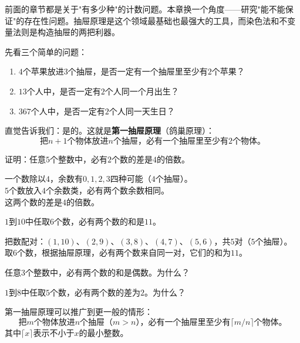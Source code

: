 
前面的章节都是关于"有多少种"的计数问题。本章换一个角度——研究"能不能保证"的存在性问题。抽屉原理是这个领域最基础也最强大的工具，而染色法和不变量法则是构造抽屉的两把利器。


先看三个简单的问题：
\begin{enumerate}
\item $4$个苹果放进$3$个抽屉，是否一定有一个抽屉里至少有$2$个苹果？
\item $13$个人中，是否一定有$2$个人同一个月出生？
\item $367$个人中，是否一定有$2$个人同一天生日？
\end{enumerate}

直觉告诉我们：是的。这就是\textbf{第一抽屉原理}（鸽巢原理）：
\[
\text{把$n+1$个物体放进$n$个抽屉，必有一个抽屉里至少有$2$个物体。}
\]

\begin{example}
证明：任意$5$个整数中，必有$2$个数的差是$4$的倍数。
\end{example}
\begin{solution}
一个数除以$4$，余数有$0,1,2,3$四种可能（$4$个抽屉）。\\
$5$个数放入$4$个余数类，必有两个数余数相同。\\
这两个数的差是$4$的倍数。
\end{solution}

\begin{example}
$1$到$10$中任取$6$个数，必有两个数的和是$11$。
\end{example}
\begin{solution}
把数配对：$(1,10)$、$(2,9)$、$(3,8)$、$(4,7)$、$(5,6)$，共$5$对（$5$个抽屉）。\\
取$6$个数，根据抽屉原理，必有两个数来自同一对，它们的和为$11$。
\end{solution}

\begin{exercise}
\item 任意$3$个整数中，必有两个数的和是偶数。为什么？
\item $1$到$8$中任取$5$个数，必有两个数的差为$2$。为什么？
\end{exercise}


第一抽屉原理可以推广到更一般的情形：
\[
\text{把$m$个物体放进$n$个抽屉（$m>n$），必有一个抽屉里至少有$\lceil m/n\rceil$个物体。}
\]
其中$\lceil x\rceil$表示不小于$x$的最小整数。

